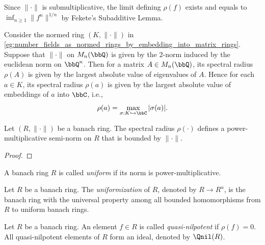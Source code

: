     Since \(\|\cdot\|\) is submultiplicative, the limit defining \(\rho(f)\) exists and equals to \(\inf_{n \geq 1} \|f^n\|^{1/n}\) by Fekete's Subadditive Lemma.

    \begin{example}\label{eg:spectral_radius_normed_rings_number_fields_by_embedding_into_matrix_rings}
        Consider the normed ring \((K, \|\cdot\|)\) in \cref{eg:number_fields_as_normed_rings_by_embedding_into_matrix_rings}.
        Suppose that \(\|\cdot\|\) on \(M_n(\bbQ)\) is given by the \(2\)-norm induced by the euclidean norm on \(\bbQ^n\).
        Then for a matrix \(A \in M_n(\bbQ)\), its spectral radius \(\rho(A)\) is given by the largest absolute value of eigenvalues of \(A\).
        Hence for each \(a \in K\), its spectral radius \(\rho(a)\) is given by the largest absolute value of embeddings of \(a\) into \(\bbC\), i.e.,
        \[
            \rho(a) = \max_{\sigma: K \hookrightarrow \bbC} |\sigma(a)|.
        \]
    \end{example}

    \begin{proposition}\label{prop:spectral_radius_defines_a_power-multiplicative_semi-norm}
        Let \((R,\|\cdot\|)\) be a banach ring.
        The spectral radius \(\rho(\cdot)\) defines a power-multiplicative semi-norm on \(R\) that is bounded by \(\|\cdot\|\).
    \end{proposition}
    \begin{proof}
    \end{proof}
    
    \begin{definition}\label{def:uniform_banach_ring}
        A banach ring \(R\) is called \emph{uniform} if its norm is power-multiplicative.
    \end{definition}

    \begin{definition}\label{def:uniformization_of_banach_rings}
        Let \(R\) be a banach ring.
        The \emph{uniformization} of \(R\), denoted by \(R \to R^u\), is the banach ring with the universal property among all bounded homomorphisms from \(R\) to uniform banach rings.
    \end{definition}

    \begin{definition}\label{def:quasi_nilpotent_element}
        Let \(R\) be a banach ring.
        An element \(f \in R\) is called \emph{quasi-nilpotent} if \(\rho(f) = 0\).
        All quasi-nilpotent elements of \(R\) form an ideal, denoted by \(\Qnil(R)\).
    \end{definition}

